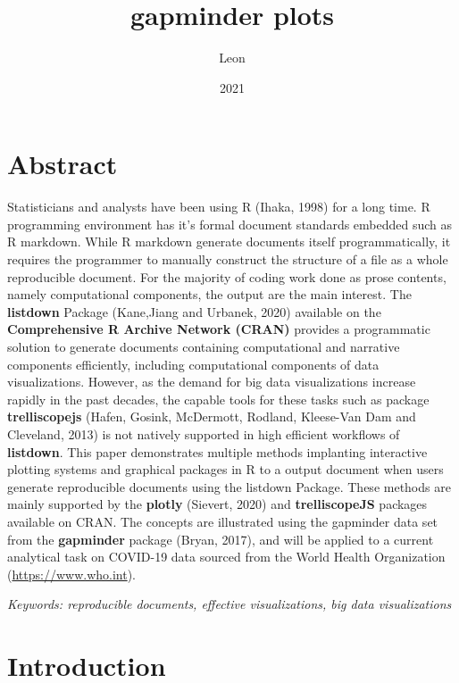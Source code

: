 \documentclass[
]{article}
\title{gapminder plots}
\author{Leon}
\date{2021}
\begin{document}
\maketitle

{
\setcounter{tocdepth}{2}
\tableofcontents
}
\hypertarget{abstract}{%
\section*{Abstract}\label{abstract}}

Statisticians and analysts have been using R (Ihaka, 1998) for a long
time. R programming environment has it's formal document standards
embedded such as R markdown. While R markdown generate documents itself
programmatically, it requires the programmer to manually construct the
structure of a file as a whole reproducible document. For the majority
of coding work done as prose contents, namely computational components,
the output are the main interest. The \textbf{listdown} Package
(Kane,Jiang and Urbanek, 2020) available on the \textbf{Comprehensive R
Archive Network (CRAN)} provides a programmatic solution to generate
documents containing computational and narrative components efficiently,
including computational components of data visualizations. However, as
the demand for big data visualizations increase rapidly in the past
decades, the capable tools for these tasks such as package
\textbf{trelliscopejs} (Hafen, Gosink, McDermott, Rodland, Kleese-Van
Dam and Cleveland, 2013) is not natively supported in high efficient
workflows of \textbf{listdown}. This paper demonstrates multiple methods
implanting interactive plotting systems and graphical packages in R to a
output document when users generate reproducible documents using the
listdown Package. These methods are mainly supported by the
\textbf{plotly} (Sievert, 2020) and \textbf{trelliscopeJS} packages
available on CRAN. The concepts are illustrated using the gapminder data
set from the \textbf{gapminder} package (Bryan, 2017), and will be
applied to a current analytical task on COVID-19 data sourced from the
World Health Organization (\url{https://www.who.int}).

\emph{Keywords: reproducible documents, effective visualizations, big
data visualizations}

\hypertarget{introduction}{%
\section{Introduction}\label{introduction}}
\end{document}
